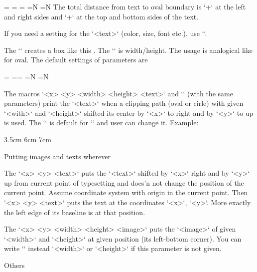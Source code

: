 {\begtt
\ovalparams={\roudness=2pt            %
             \fcolor=\Yellow          %
             \lcolor=\Red             %
             \lwidth=0.5bp            %
             \shadow=N                %
             \overlapmargins=N        %
             \hhkern=0pt \vvkern=0pt} %
\endtt
The total distance from text to oval boundary is `\hhkern+\roudness` at the left and right 
sides and
`\vvkern+\roundness` at the top and bottom sides of the text.

If you need a setting for the `<text>` (color, size, font etc.), use
``.

\new
The `` creates a box like this .
The `\ratio` is width/height. The usage is analogical like for oval. 
The default settings of parameters are

\begtt
\circleparams={ \fcolor=\Yellow \lcolor=\Red \lwidth=0.5bp 
               \shadow=N \ignoremargins=N \hhkern=2pt \vvkern=2pt}
\endtt

\new
The macros `\clipinoval <x> <y> <width> <height> {<text>}`
and `\clipincircle` (with the same parameters)
print the `<text>` when a clipping path (oval or cirle) with given
`<with>` and `<height>` shifted its center by `<x>` to right and by `<y>` to up
is used. 
The `\roundness=5mm` is default for `\clipingoval` and user can change it.
Example:

\begtt 
\clipincircle 3cm 3.5cm 6cm 7cm {\picw=6cm } 
\endtt

\secc Putting images and texts wherever

\new
The `\puttext <x> <y> {<text>}` puts the `<text>` shifted by `<x>` right and by
`<y>` up from current point of typesetting and does'n not change the
position of the current point. Assume coordinate system with origin in the
current point. Then `\puttext <x> <y> {<text>}` puts the text at the
coordinates `<x>`, `<y>`. More exactly the left edge of its baseline is at that
position. 

\new
The `\putpic <x> <y> <width> <height> {<image>}` puts the `<image>` of given 
`<width>` and `<height>` at given position (its left-bottom corner).
You can write `\nospec` instead `<width>` or `<height>` if this parameter is
not given.

\sec Others

}
